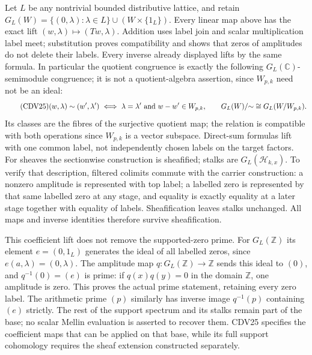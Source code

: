 \documentclass[11pt,a4paper]{article}
\theoremstyle{definition}\newtheorem{definition}[theorem]{Definition}
\begin{document}
Let $L$ be any nontrivial bounded distributive lattice, and retain
$G_L(W)=\{(0,\lambda):\lambda\in L\}\cup(W\times\{1_L\})$.
Every linear map above has the exact lift
$(w,\lambda)\mapsto(Tw,\lambda)$. Addition uses label join and
scalar multiplication label meet; substitution proves compatibility
and shows that zeros of amplitudes do not delete their labels.
Every inverse already displayed lifts by the same formula.
In particular the quotient congruence is exactly
the following $G_L(\mathbb C)$-semimodule congruence; it is not
a quotient-algebra assertion, since $W_{p,k}$ need not be an ideal:
\begin{equation}\tag{CDV25}
 (w,\lambda)\sim(w',\lambda')
 \ \Longleftrightarrow\ \lambda=\lambda'\ \hbox{and}\ w-w'\in W_{p,k},
 \qquad G_L(W)/{\sim}\cong G_L(W/W_{p,k}).
\end{equation}
Its classes are the fibres of the surjective quotient map;
the relation is compatible with both operations since $W_{p,k}$
is a vector subspace. Direct-sum formulas lift with one common
label, not independently chosen labels on the target factors.
For sheaves the sectionwise construction is sheafified; stalks are
$G_L(\mathcal H_{k,x})$. To verify that description, filtered
colimits commute with the carrier construction: a nonzero amplitude
is represented with top label; a labelled zero is represented by
that same labelled zero at any stage, and equality is exactly
equality at a later stage together with equality of labels.
Sheafification leaves stalks unchanged. All maps and inverse
identities therefore survive sheafification.

This coefficient lift does not remove the supported-zero prime.
For $G_L(\mathbb Z)$ its element $e=(0,1_L)$ generates the ideal
of all labelled zeros, since $e(a,\lambda)=(0,\lambda)$.
The amplitude map $q:G_L(\mathbb Z)\to\mathbb Z$ sends this
ideal to $(0)$, and $q^{-1}(0)=(e)$ is prime: if $q(x)q(y)=0$
in the domain $\mathbb Z$, one amplitude is zero. This proves
the actual prime statement, retaining every zero label. The
arithmetic prime $(p)$ similarly has inverse image $q^{-1}(p)$
containing $(e)$ strictly. The rest of the support spectrum and
its stalks remain part of the base; no scalar Mellin evaluation
is asserted to recover them. CDV25 specifies the coefficient
maps that can be applied on that base, while its full support
cohomology requires the sheaf extension constructed separately.

\clearpage

\end{document}
